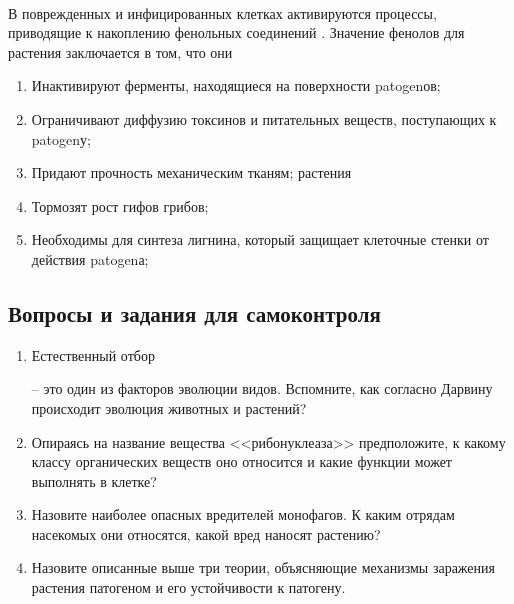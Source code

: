 
\paragraph*{}В поврежденных и инфицированных клетках активируются процессы, приводящие к накоплению фенольных соединений \cite{kosulina_93}. Значение фенолов для растения заключается в том, что они

\begin{enumerate}
	\item Инактивируют ферменты, находящиеся на поверхности \gls{patogen}ов; 
	\item Ограничивают диффузию токсинов и питательных веществ, поступающих к \gls{patogen}у; 
	\item Придают прочность механическим тканям;  растения
	\item Тормозят рост гифов грибов;
	\item Необходимы для синтеза лигнина, который защищает клеточные стенки от действия \gls{patogen}а;
\end{enumerate}



\subsection*{Вопросы и задания для самоконтроля}

\begin{enumerate}
\item \hypertarget{naturel_selection_quest}{Естественный отбор}-- это один из факторов эволюции видов. Вспомните, как согласно Дарвину происходит эволюция животных и растений?
\item Опираясь на название вещества <<\hypertarget{ribonukleasa_quest}{рибонуклеаза}>> предположите, к какому классу органических веществ оно относится и какие функции может выполнять в клетке?
\item Назовите наиболее опасных \hypertarget{pests_question}{вредителей} монофагов. К каким отрядам насекомых они относятся, какой вред наносят растению?
\item Назовите описанные выше три \hypertarget{resistence_theories_quest}{теории}, объясняющие механизмы заражения растения патогеном и его устойчивости к патогену.
\end{enumerate}